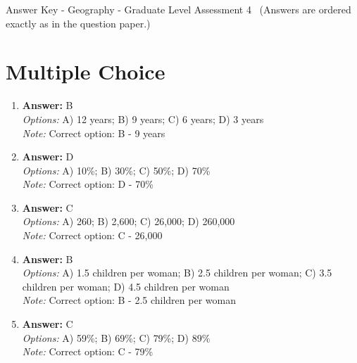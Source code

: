 \documentclass[12pt]{article}
\begin{document}
\begin{center}
Answer Key - Geography - Graduate Level Assessment 4 \
\small (Answers are ordered exactly as in the question paper.)
\end{center}

\section*{Multiple Choice}
\begin{enumerate}[label=\arabic*.]
\item \textbf{Answer:} B
\\ \textit{Options:} A) 12 years; B) 9 years; C) 6 years; D) 3 years
\\ \textit{Note:} Correct option: B - 9 years
\item \textbf{Answer:} D
\\ \textit{Options:} A) 10\%; B) 30\%; C) 50\%; D) 70\%
\\ \textit{Note:} Correct option: D - 70\%
\item \textbf{Answer:} C
\\ \textit{Options:} A) 260; B) 2,600; C) 26,000; D) 260,000
\\ \textit{Note:} Correct option: C - 26,000
\item \textbf{Answer:} B
\\ \textit{Options:} A) 1.5 children per woman; B) 2.5 children per woman; C) 3.5 children per woman; D) 4.5 children per woman
\\ \textit{Note:} Correct option: B - 2.5 children per woman
\item \textbf{Answer:} C
\\ \textit{Options:} A) 59\%; B) 69\%; C) 79\%; D) 89\%
\\ \textit{Note:} Correct option: C - 79\%
\end{enumerate}
\end{document}
